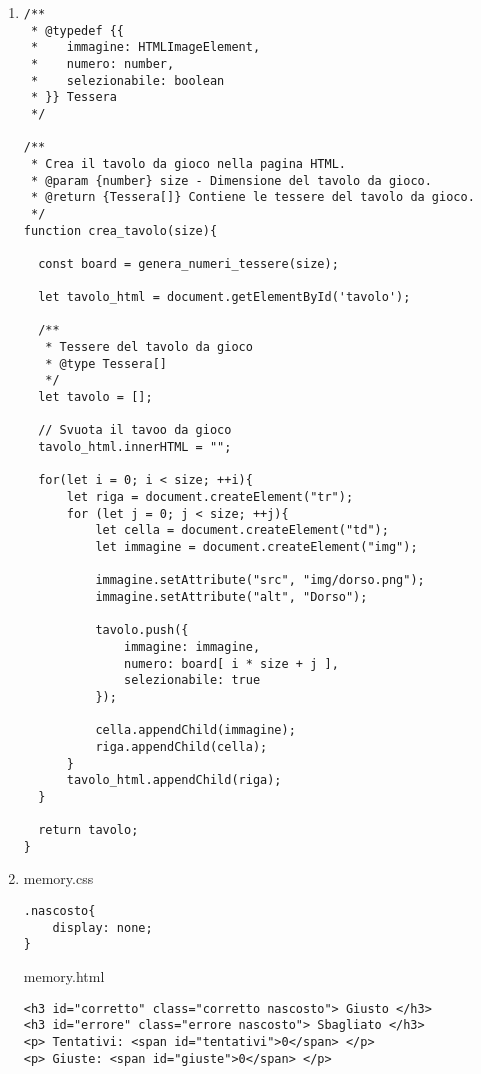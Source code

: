 \begin{frame}[fragile]\transfade
  \begin{sol}\centering
    \begin{enumerate}
      \item

      \begin{multicols}{2}
\begin{verbatim}
/**
 * @typedef {{
 *    immagine: HTMLImageElement,
 *    numero: number,
 *    selezionabile: boolean
 * }} Tessera
 */

/**
 * Crea il tavolo da gioco nella pagina HTML.
 * @param {number} size - Dimensione del tavolo da gioco.
 * @return {Tessera[]} Contiene le tessere del tavolo da gioco.
 */
function crea_tavolo(size){

  const board = genera_numeri_tessere(size);

  let tavolo_html = document.getElementById('tavolo');

  /**
   * Tessere del tavolo da gioco
   * @type Tessera[]
   */
  let tavolo = [];

  // Svuota il tavoo da gioco
  tavolo_html.innerHTML = "";

  for(let i = 0; i < size; ++i){
      let riga = document.createElement("tr");
      for (let j = 0; j < size; ++j){
          let cella = document.createElement("td");
          let immagine = document.createElement("img");

          immagine.setAttribute("src", "img/dorso.png");
          immagine.setAttribute("alt", "Dorso");

          tavolo.push({
              immagine: immagine,
              numero: board[ i * size + j ],
              selezionabile: true
          });

          cella.appendChild(immagine);
          riga.appendChild(cella);
      }
      tavolo_html.appendChild(riga);
  }

  return tavolo;
}
      \end{verbatim}
      \end{multicols}
    \end{enumerate}
  \end{sol}
\end{frame}
\begin{frame}[fragile]\transfade
  \begin{sol}\centering
    \begin{enumerate}
    \setcounter{enumi}{1}
      \item memory.css
      \begin{verbatim}
.nascosto{
    display: none;
}
      \end{verbatim}
      memory.html
      \begin{verbatim}
<h3 id="corretto" class="corretto nascosto"> Giusto </h3>
<h3 id="errore" class="errore nascosto"> Sbagliato </h3>
<p> Tentativi: <span id="tentativi">0</span> </p>
<p> Giuste: <span id="giuste">0</span> </p>
      \end{verbatim}
    \end{enumerate}
  \end{sol}
\end{frame}
